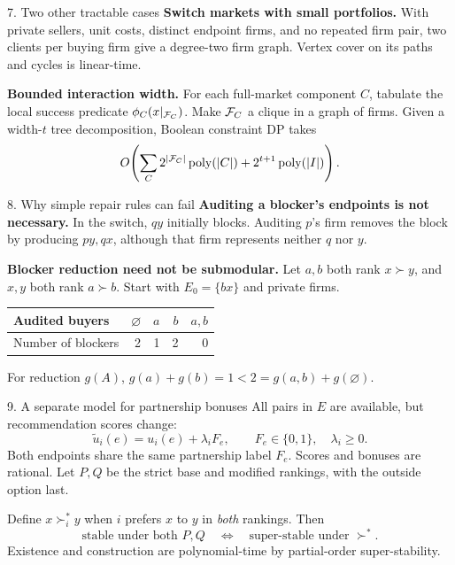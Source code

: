 \begin{frame}[t,label=tractable]{7. Two other tractable cases}
\small
\textbf{Switch markets with small portfolios.}
With private sellers, unit costs, distinct endpoint firms, and no repeated
firm pair, two clients per buying firm give a degree-two firm graph.
Vertex cover on its paths and cycles is linear-time.

\medskip
\textbf{Bounded interaction width.}
For each full-market component $C$, tabulate the local success predicate
$\phi_C(x|_{\mathcal F_C})$. Make $\mathcal F_C$ a clique in a graph of firms.
Given a width-$t$ tree decomposition, Boolean constraint DP takes
\[
 O\!\left(\sum_C2^{|\mathcal F_C|}\operatorname{poly}(|C|)
       +2^{t+1}\operatorname{poly}(|I|)\right).
\]
\end{frame}

\begin{frame}[t,label=pitfalls]{8. Why simple repair rules can fail}
\small
\textbf{Auditing a blocker's endpoints is not necessary.}
In the switch, $qy$ initially blocks. Auditing $p$'s firm removes the block
by producing $py,qx$, although that firm represents neither $q$ nor $y$.

\medskip
\textbf{Blocker reduction need not be submodular.}
Let $a,b$ both rank $x\succ y$, and $x,y$ both rank $a\succ b$.
Start with $E_0=\{bx\}$ and private firms.
\begin{center}
\begin{tabular}{@{}lrrrr@{}}
\toprule
Audited buyers & $\varnothing$ & $a$ & $b$ & $a,b$\\
\midrule
Number of blockers & 2 & 1 & 2 & 0\\
\bottomrule
\end{tabular}
\end{center}
For reduction $g(A)$, $g(a)+g(b)=1<2=g(a,b)+g(\varnothing)$.
\end{frame}

\begin{frame}[t,label=bonus]{9. A separate model for partnership bonuses}
\small
All pairs in $E$ are available, but recommendation scores change:
\[
 \widetilde u_i(e)=u_i(e)+\lambda_iF_e,\qquad
 F_e\in\{0,1\},\quad\lambda_i\geq0.
\]
Both endpoints share the same partnership label $F_e$.
Scores and bonuses are rational. Let $P,Q$ be the strict base and modified
rankings, with the outside option last.

\medskip
Define $x\succ_i^*y$ when $i$ prefers $x$ to $y$ in \emph{both} rankings.
Then
\[
 \text{stable under both }P,Q
 \quad\Longleftrightarrow\quad
 \text{super-stable under }\succ^*.
\]
Existence and construction are polynomial-time by partial-order super-stability.
\end{frame}

